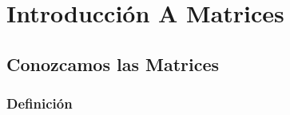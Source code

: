 \documentclass[12pt, fleqn]{report}                             %
\theoremstyle{break}                                            %
\begin{document}
\restoregeometry                                                    %
\nopagecolor                                                        %




\tableofcontents{}
\label{sec:Index}

\clearpage










\part{Introducción A Matrices}
\clearpage




    \chapter{Conozcamos las Matrices}



        \clearpage
        \section{Definición}
\end{document}
